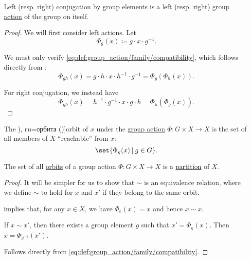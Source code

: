 \begin{proposition}\label{thm:group_conjugation_action}
  Left (resp. right) \hyperref[def:group_conjugation]{conjugation} by group elements is a left (resp. right) \hyperref[def:group_action]{group action} of the group on itself.
\end{proposition}
\begin{proof}
  We will first consider left actions. Let
  \begin{equation*}
    \Phi_g(x) \coloneqq g \cdot x \cdot g^{-1}.
  \end{equation*}

  We must only verify \eqref{eq:def:group_action/family/compatibility}, which follows directly from :
  \begin{equation*}
    \Phi_{gh}(x)
    =
    g \cdot h \cdot x \cdot h^{-1} \cdot g^{-1}
    =
    \Phi_g(\Phi_h(x)).
  \end{equation*}

  For right conjugation, we instead have
  \begin{equation*}
    \Phi_{gh}(x)
    =
    h^{-1} \cdot g^{-1} \cdot x \cdot g \cdot h
    =
    \Phi_h(\Phi_g(x)).
  \end{equation*}
\end{proof}

\begin{definition}\label{def:group_action_orbit}
  The \term[bg=орбита (\cite[def. IV.20]{ГеновМиховскиМоллов1991Алгебра}), ru=орбита (\cite[453]{Винберг2014Алгебра})]{orbit} of \( x \) under the \hyperref[def:group_action]{group action} \( \Phi: G \times X \to X \) is the set of all members of \( X \) \enquote{reachable} from \( x \):
  \begin{equation*}
    \set{ \Phi_g(x) \given g \in G }.
  \end{equation*}
\end{definition}

\begin{proposition}\label{thm:orbit_induces_partition}
  The set of all \hyperref[def:group_action_orbit]{orbits} of a group action \( \Phi: G \times X \to X \) is a \hyperref[def:set_partition]{partition} of \( X \).
\end{proposition}
\begin{proof}
  It will be simpler for us to show that \( {\sim} \) is an equivalence relation, where we define \( {\sim} \) to hold for \( x \) and \( x' \) if they belong to the same orbit.

    implies that, for any \( x \in X \), we have \( \Phi_e(x) = x \) and hence \( x \sim x \).

   If \( x \sim x' \), then there exists a group element \( g \) such that \( x' = \Phi_g(x) \). Then \( x = \Phi_{g^{-1}}(x') \).

   Follows directly from \eqref{eq:def:group_action/family/compatibility}.
\end{proof}

